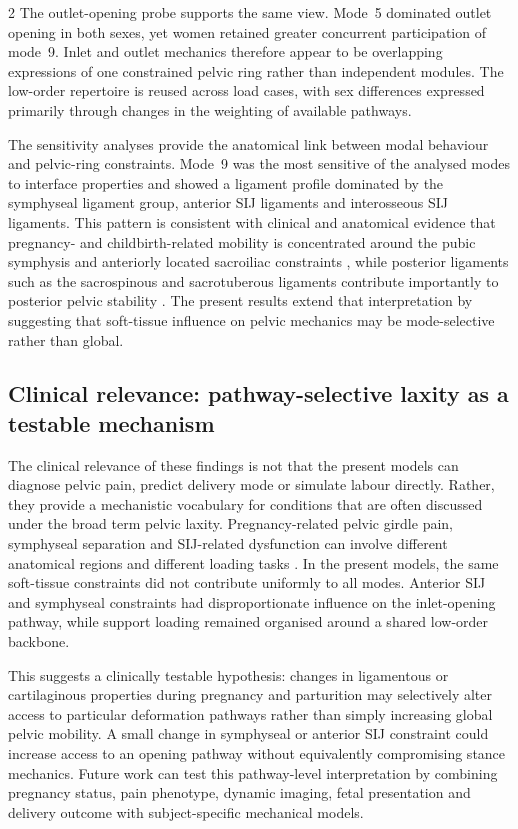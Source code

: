 \documentclass[openacc]{rsproca_new}
\begin{document}
\begin{multicols}{2}
The outlet-opening probe supports the same view. Mode~5 dominated outlet opening in both sexes, yet women retained greater concurrent participation of mode~9. Inlet and outlet mechanics therefore appear to be overlapping expressions of one constrained pelvic ring rather than independent modules. The low-order repertoire is reused across load cases, with sex differences expressed primarily through changes in the weighting of available pathways.

The sensitivity analyses provide the anatomical link between modal behaviour and pelvic-ring constraints. Mode~9 was the most sensitive of the analysed modes to interface properties and showed a ligament profile dominated by the symphyseal ligament group, anterior SIJ ligaments and interosseous SIJ ligaments. This pattern is consistent with clinical and anatomical evidence that pregnancy- and childbirth-related mobility is concentrated around the pubic symphysis and anteriorly located sacroiliac constraints \cite{Damen2001,Pires2015,Cicek2015,Fiani2021}, while posterior ligaments such as the sacrospinous and sacrotuberous ligaments contribute importantly to posterior pelvic stability \cite{Hammer2019,Aldabe2019}. The present results extend that interpretation by suggesting that soft-tissue influence on pelvic mechanics may be mode-selective rather than global.

\subsection{Clinical relevance: pathway-selective laxity as a testable mechanism}

The clinical relevance of these findings is not that the present models can diagnose pelvic pain, predict delivery mode or simulate labour directly. Rather, they provide a mechanistic vocabulary for conditions that are often discussed under the broad term pelvic laxity. Pregnancy-related pelvic girdle pain, symphyseal separation and SIJ-related dysfunction can involve different anatomical regions and different loading tasks \cite{Damen2001,Vleeming2012,Kiapour2019,Stolarczyk2021}. In the present models, the same soft-tissue constraints did not contribute uniformly to all modes. Anterior SIJ and symphyseal constraints had disproportionate influence on the inlet-opening pathway, while support loading remained organised around a shared low-order backbone.

This suggests a clinically testable hypothesis: changes in ligamentous or cartilaginous properties during pregnancy and parturition may selectively alter access to particular deformation pathways rather than simply increasing global pelvic mobility. A small change in symphyseal or anterior SIJ constraint could increase access to an opening pathway without equivalently compromising stance mechanics. Future work can test this pathway-level interpretation by combining pregnancy status, pain phenotype, dynamic imaging, fetal presentation and delivery outcome with subject-specific mechanical models.


\end{multicols}
\end{document}
